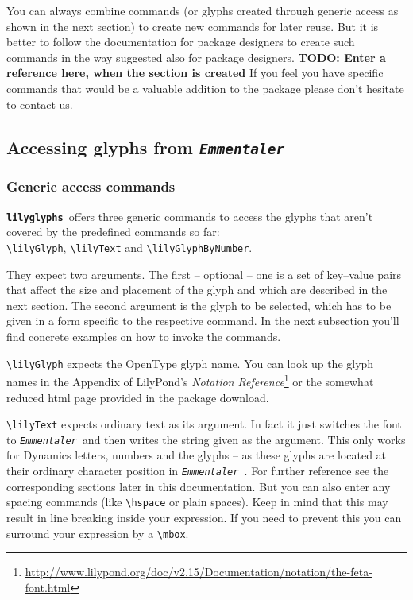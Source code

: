 \documentclass{article}
\newcommand*{\lilyglyphs}{\texttt{\textbf{lilyglyphs\,}}}
\newcommand*{\emmentaler}{\texttt{\textit{Emmentaler }}}
\newcommand*{\cmd}[1]{\texttt{\textbackslash #1}}
\begin{document}
You can always combine commands (or glyphs created through generic access as shown in the next section) to create new commands for later reuse. 
But it is better to follow the documentation for package designers to create such commands in the way suggested also for package designers.
\textbf{TODO: Enter a reference here, when the section is created}
If you feel you have specific commands that would be a valuable addition to the package please don't hesitate to contact us.



\subsection{Accessing glyphs from \emmentaler}
\label{subsec:acc_glyphs_emmentaler}
\subsubsection{Generic access commands}
\label{subsubsec:generic_access_commands}
\lilyglyphs offers three generic commands to access the glyphs that aren't covered by the predefined commands so far: \\
\cmd{lilyGlyph}, \cmd{lilyText} and \cmd{lilyGlyphByNumber}. 

They expect two arguments. 
The first -- optional -- one is a set of key--value pairs that affect the size and placement of the glyph and which are described in the next section.
The second argument is the glyph to be selected, which has to be given in a form specific to the respective command.
In the next subsection you'll find concrete examples on how to invoke the commands.

\cmd{lilyGlyph} expects the OpenType glyph name. 
You can look up the glyph names in the Appendix of LilyPond's \emph{Notation Reference}\footnote{\url{http://www.lilypond.org/doc/v2.15/Documentation/notation/the-feta-font.html}} or the somewhat reduced html page provided in the package download.

\cmd{lilyText} expects ordinary text as its argument. 
In fact it just switches the font to \emmentaler and then writes the string given as the argument. 
This only works for Dynamics letters, numbers and the glyphs  -- as these glyphs are located at their ordinary character position in \emmentaler. 
For further reference see the corresponding sections later in this documentation. 
But you can also enter any spacing commands (like \cmd{hspace} or plain spaces). 
Keep in mind that this may result in line breaking inside your expression. 
If you need to prevent this you can surround your expression by a \cmd{mbox}.
\end{document}
